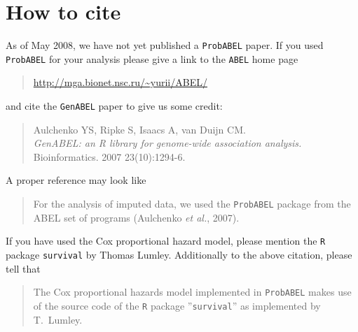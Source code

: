 \documentclass[12pt,a4paper]{article}
\begin{document}
\section{How to cite}

As of May 2008, we have not yet published a
\texttt{ProbABEL} paper. If you used \texttt{ProbABEL} for 
your analysis please give a link to the \texttt{ABEL} home 
page 

\begin{quote}
\url{http://mga.bionet.nsc.ru/~yurii/ABEL/}
\end{quote}
and cite the \texttt{GenABEL} paper to give us some credit: 
\begin{quote}
Aulchenko YS, Ripke S, Isaacs A, van Duijn CM.\\
\emph{GenABEL: an R library for genome-wide association analysis.}\\
Bioinformatics. 2007 23(10):1294-6. 
\end{quote}
A proper reference may look like 
\begin{quote}
For the analysis of imputed data, we used the \texttt{ProbABEL} package 
from the ABEL set of programs (Aulchenko \emph{et al.}, 2007). 
\end{quote}

If you have used the Cox proportional hazard model, please mention the 
\texttt{R} package \texttt{survival} by Thomas Lumley. Additionally 
to the above citation, please tell that 
\begin{quote}
The Cox proportional hazards model implemented in \texttt{ProbABEL} 
makes use of the source code of the \texttt{R} package ''\texttt{survival}'' 
as implemented by T.~Lumley. 
\end{quote}






\printindex
\end{document}
